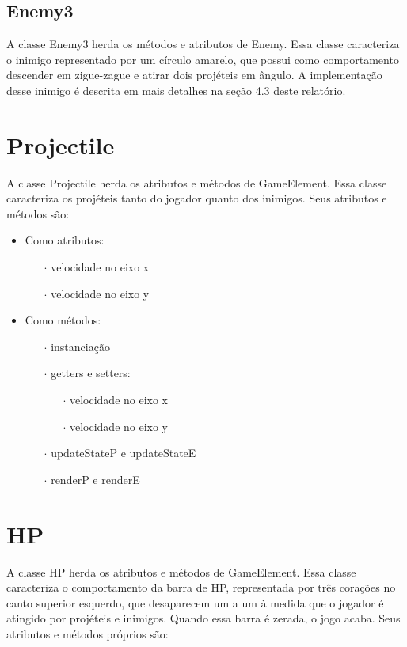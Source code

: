 \documentclass[
	12pt,				%
	oneside,			%
	a4paper,			%
	english,			%
	brazil				%
	]{abntex2ppgsi}
\begin{document}
\subsection{Enemy3}

A classe Enemy3 herda os métodos e atributos de Enemy. Essa classe caracteriza o inimigo representado por um círculo amarelo, que possui como comportamento descender em zigue-zague e atirar dois projéteis em ângulo. A implementação desse inimigo é descrita em mais detalhes na seção 4.3 deste relatório.

\section{Projectile}

A classe Projectile herda os atributos e métodos de GameElement. Essa classe caracteriza os projéteis tanto do jogador quanto dos inimigos. Seus atributos e métodos são:

\begin{itemize}
    \item Como atributos:
    \begin{itemize}
        \item[$\cdot$] velocidade no eixo x
        \item[$\cdot$] velocidade no eixo y
    \end{itemize}
    \item Como métodos:
    \begin{itemize}
        \item[$\cdot$] instanciação
        \item[$\cdot$] getters e setters:
        \begin{itemize}
            \item[$\cdot$] velocidade no eixo x
            \item[$\cdot$] velocidade no eixo y
        \end{itemize}
        \item[$\cdot$] updateStateP e updateStateE
        \item[$\cdot$] renderP e renderE
    \end{itemize}
\end{itemize}

\section{HP}

A classe HP herda os atributos e métodos de GameElement. Essa classe caracteriza o comportamento da barra de HP, representada por três corações no canto superior esquerdo, que desaparecem um a um à medida que o jogador é atingido por projéteis e inimigos. Quando essa barra é zerada, o jogo acaba. Seus atributos e métodos próprios são:
\end{document}
